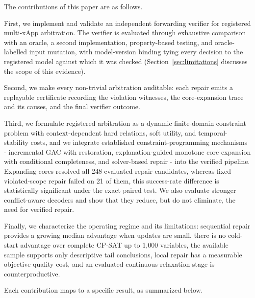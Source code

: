 \documentclass[pdflatex,sn-mathphys-num,iicol,oneside]{sn-jnl}
\newcommand{\gac}{\textsc{GAC}\xspace}
\newcommand{\cpsat}{\textsc{CP-SAT}\xspace}
\begin{document}
The contributions of this paper are as follows.

First, we implement and validate an independent forwarding verifier
for registered multi-xApp arbitration. The verifier is evaluated
through exhaustive comparison with an oracle, a second
implementation, property-based testing, and oracle-labelled input
mutation, with model-version binding tying every decision to the
registered model against which it was checked
(Section~\ref{sec:limitations} discusses the scope of this
evidence).

Second, we make every non-trivial arbitration auditable: each repair
emits a replayable certificate recording the violation witnesses, the
core-expansion trace and its causes, and the final verifier outcome.

Third, we formulate registered arbitration as a dynamic finite-domain
constraint problem with context-dependent hard relations, soft
utility, and temporal-stability costs, and we integrate established
constraint-programming mechanisms - incremental \gac with restoration,
explanation-guided monotone core expansion with conditional
completeness, and solver-based repair - into the verified pipeline.
Expanding cores resolved all 248 evaluated repair candidates, whereas
fixed violated-scope repair failed on 21 of them, this success-rate
difference is statistically significant under the exact paired test.
We also evaluate stronger conflict-aware decoders and show that they
reduce, but do not eliminate, the need for verified repair.

Finally, we characterize the operating regime and its limitations:
sequential repair provides a growing median advantage when updates
are small, there is no cold-start advantage over complete \cpsat up
to 1{,}000 variables, the available sample supports only descriptive
tail conclusions, local repair has a measurable objective-quality
cost, and an evaluated continuous-relaxation stage is
counterproductive.

Each contribution maps to a specific result, as summarized below.
\end{document}
